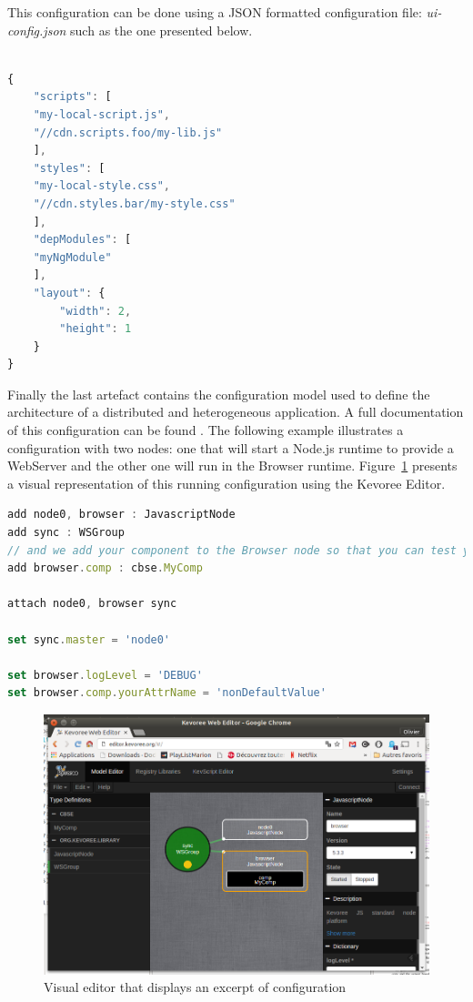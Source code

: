  
This configuration can be done  using a JSON formatted configuration file: \emph{ui-config.json} such as the one presented below.
 
\begin{lstlisting}[language=JavaScript,numbers=right,firstnumber=1,basicstyle=\scriptsize,deletekeywords={port}]

{
	"scripts": [
	"my-local-script.js",
	"//cdn.scripts.foo/my-lib.js"
	],
	"styles": [
	"my-local-style.css",
	"//cdn.styles.bar/my-style.css"
	],
	"depModules": [
	"myNgModule"
	],
	"layout": {
		"width": 2,
		"height": 1
	}
}
\end{lstlisting}

Finally the last artefact contains the configuration model used to define the architecture of a distributed and heterogeneous application. A full documentation of this configuration can be found \cite{http://kevoree.org/doc/}. The following example  illustrates a configuration with two nodes: one that will start a Node.js runtime to provide a WebServer 
 and the other one will run in the Browser runtime. Figure~\ref{fig:fig6} presents a visual representation of this running configuration using the Kevoree Editor. 


\begin{lstlisting}[language=JavaScript,numbers=right,firstnumber=1,basicstyle=\scriptsize,morekeywords={add,attach,set,network}]
add node0, browser : JavascriptNode
add sync : WSGroup
// and we add your component to the Browser node so that you can test your UI
add browser.comp : cbse.MyComp

attach node0, browser sync

set sync.master = 'node0'

set browser.logLevel = 'DEBUG'
set browser.comp.yourAttrName = 'nonDefaultValue'

\end{lstlisting}

\begin{figure}[h]
	\centering
	\includegraphics[width=1.\columnwidth]{figures/fig6}
	\caption{Visual editor that displays an excerpt of configuration}
	\label{fig:fig6}
\end{figure}


